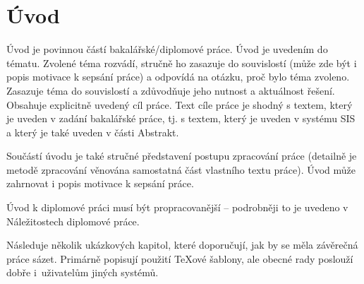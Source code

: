 \chapter*{Úvod}

Úvod je povinnou částí bakalářské/diplomové práce. Úvod je uvedením do tématu. Zvolené téma rozvádí, stručně ho zasazuje do souvislostí (může zde být i popis motivace k sepsání práce) a odpovídá na otázku, proč bylo téma zvoleno. Zasazuje téma do souvislostí a zdůvodňuje jeho nutnost a aktuálnost řešení. Obsahuje explicitně uvedený cíl práce. Text cíle práce je shodný s textem, který je uveden v zadání bakalářské práce, tj. s textem, který je uveden v systému SIS a který je také uveden v části Abstrakt.

Součástí úvodu je také stručné představení postupu zpracování práce (detailně je metodě zpracování věnována samostatná část vlastního textu práce). Úvod může zahrnovat i popis motivace k sepsání práce.

Úvod k diplomové práci musí být propracovanější -- podrobněji to je uvedeno v Náležitostech diplomové práce.

Následuje několik ukázkových kapitol, které doporučují, jak by se měla závěrečná práce sázet. Primárně popisují použití \TeX{}ové šablony, ale obecné rady poslouží dobře i~uživatelům jiných systémů.

